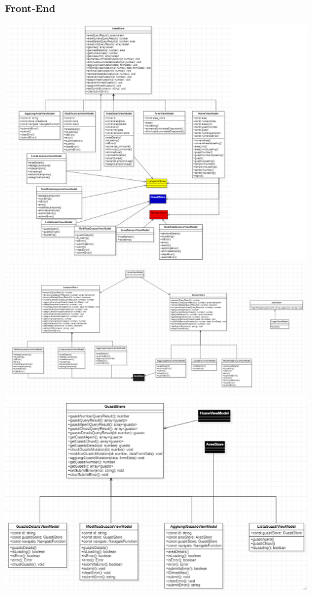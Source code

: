 \documentclass[12pt]{article}
\begin{document}
\subsubsection{Front-End}
\includegraphics[width=475pt]{Front-End.png}
\clearpage
\includegraphics[width=475pt]{Front-End2.png}
\includegraphics[width=475pt]{Guasti.png}
\end{document}
